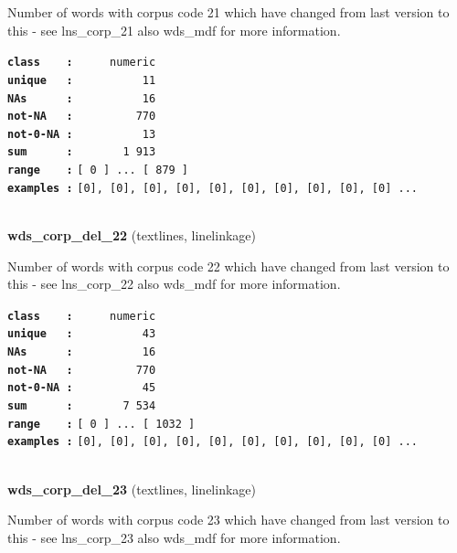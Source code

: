 \documentclass[]{article}
\begin{document}
Number of words with corpus code 21 which have changed from last version
to this - see lns\_corp\_21 also wds\_mdf for more information.

\textbf{\texttt{class\ \ \ \ :}} \texttt{~~~~~numeric}\\
\textbf{\texttt{unique\ \ \ :}} \texttt{~~~~~~~~~~11}\\
\textbf{\texttt{NAs\ \ \ \ \ \ :}} \texttt{~~~~~~~~~~16}\\
\textbf{\texttt{not-NA\ \ \ :}} \texttt{~~~~~~~~~770}\\
\textbf{\texttt{not-0-NA\ :}} \texttt{~~~~~~~~~~13}\\
\textbf{\texttt{sum\ \ \ \ \ \ :}} \texttt{~~~~~~~1~913}\\
\textbf{\texttt{range\ \ \ \ :}}
\texttt{{[}\ 0\ {]}\ ...\ {[}\ 879\ {]}}\\
\textbf{\texttt{examples\ :}}
\texttt{{[}0{]},\ {[}0{]},\ {[}0{]},\ {[}0{]},\ {[}0{]},\ {[}0{]},\ {[}0{]},\ {[}0{]},\ {[}0{]},\ {[}0{]}\ ...}\\

~

\textbf{wds\_corp\_del\_22} (textlines, linelinkage)

Number of words with corpus code 22 which have changed from last version
to this - see lns\_corp\_22 also wds\_mdf for more information.

\textbf{\texttt{class\ \ \ \ :}} \texttt{~~~~~numeric}\\
\textbf{\texttt{unique\ \ \ :}} \texttt{~~~~~~~~~~43}\\
\textbf{\texttt{NAs\ \ \ \ \ \ :}} \texttt{~~~~~~~~~~16}\\
\textbf{\texttt{not-NA\ \ \ :}} \texttt{~~~~~~~~~770}\\
\textbf{\texttt{not-0-NA\ :}} \texttt{~~~~~~~~~~45}\\
\textbf{\texttt{sum\ \ \ \ \ \ :}} \texttt{~~~~~~~7~534}\\
\textbf{\texttt{range\ \ \ \ :}}
\texttt{{[}\ 0\ {]}\ ...\ {[}\ 1032\ {]}}\\
\textbf{\texttt{examples\ :}}
\texttt{{[}0{]},\ {[}0{]},\ {[}0{]},\ {[}0{]},\ {[}0{]},\ {[}0{]},\ {[}0{]},\ {[}0{]},\ {[}0{]},\ {[}0{]}\ ...}\\

~

\textbf{wds\_corp\_del\_23} (textlines, linelinkage)

Number of words with corpus code 23 which have changed from last version
to this - see lns\_corp\_23 also wds\_mdf for more information.
\end{document}
